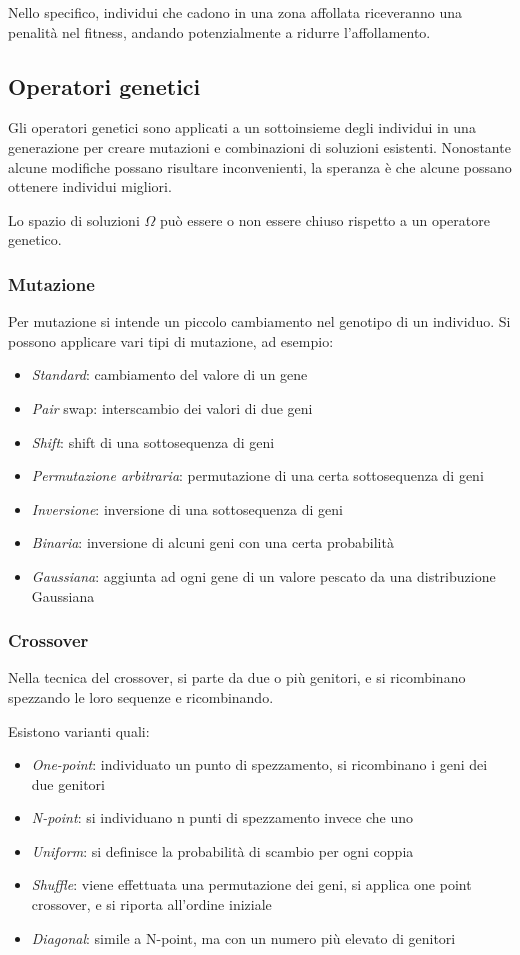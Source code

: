 \documentclass[a4paper]{article}
\begin{document}
Nello specifico, individui che cadono in una zona affollata riceveranno una penalità
nel fitness, andando potenzialmente a ridurre l'affollamento.

\subsection{Operatori genetici}
Gli operatori genetici sono applicati a un sottoinsieme degli individui in 
una generazione per creare mutazioni e combinazioni di soluzioni esistenti.
Nonostante alcune modifiche possano risultare inconvenienti, la speranza è che 
alcune possano ottenere individui migliori.

Lo spazio di soluzioni $\Omega$ può essere o non essere chiuso rispetto 
a un operatore genetico.

\subsubsection{Mutazione}
Per mutazione si intende un piccolo cambiamento nel genotipo di un individuo.
Si possono applicare vari tipi di mutazione, ad esempio:
\begin{itemize}
    \item \emph{Standard}: cambiamento del valore di un gene
    \item \emph{Pair} swap: interscambio dei valori di due geni
    \item \emph{Shift}: shift di una sottosequenza di geni
    \item \emph{Permutazione arbitraria}: permutazione di una certa sottosequenza di geni
    \item \emph{Inversione}: inversione di una sottosequenza di geni
    \item \emph{Binaria}: inversione di alcuni geni con una certa probabilità
    \item \emph{Gaussiana}: aggiunta ad ogni gene di un valore pescato da una distribuzione Gaussiana
\end{itemize}
\subsubsection{Crossover}
Nella tecnica del crossover, si parte da due o più genitori, e si ricombinano 
spezzando le loro sequenze e ricombinando.

Esistono varianti quali:
\begin{itemize}
    \item \emph{One-point}: individuato un punto di spezzamento, si ricombinano i geni dei due genitori
    \item \emph{N-point}: si individuano n punti di spezzamento invece che uno
    \item \emph{Uniform}: si definisce la probabilità di scambio per ogni coppia
    \item \emph{Shuffle}: viene effettuata una permutazione dei geni, si applica one point crossover, 
    e si riporta all'ordine iniziale
    \item \emph{Diagonal}: simile a N-point, ma con un numero più elevato di genitori
\end{itemize}
\end{document}
